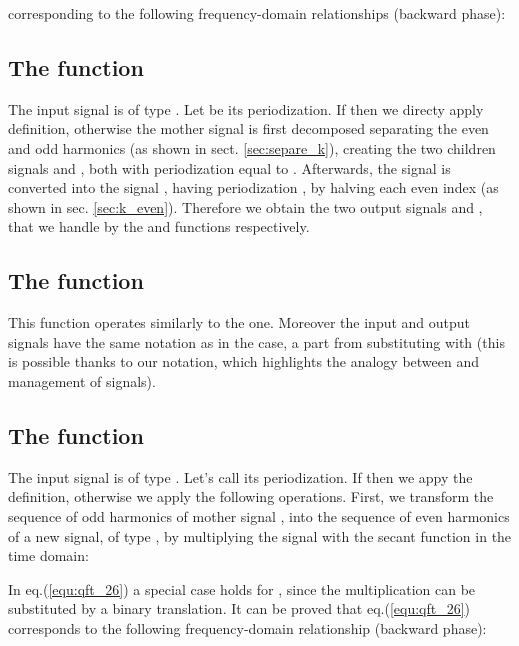 \documentclass[a4paper,10pt]{article}
\begin{document}
corresponding to the following frequency-domain relationships (backward phase):
















\subsection{The  function} \label{dct_function}

The input signal is of type . 
Let  be its periodization.
If  then we directy apply  definition, otherwise the mother signal  is first decomposed separating the even and odd harmonics (as shown in sect. \ref{sec:separe_k}), creating the two children signals  and , both with periodization equal to . 
Afterwards, the signal  is converted into the signal , having periodization , by halving each even  index (as shown in sec. \ref{sec:k_even}). 
Therefore we obtain the two output signals  and , that we handle by the  and  functions respectively.


\subsection{The  function}

This function operates similarly to the  one.
Moreover the input and output signals have the same notation as in the  case, a part from substituting  with  (this is possible thanks to our notation, 
which highlights the analogy between  and  management of signals).


\subsection{The  function}

The input signal is of type . Let's call  its periodization.
If  then we appy the  definition, otherwise we apply the following operations.
First, we transform the sequence of odd harmonics of mother signal , into the sequence of even harmonics of a new signal, of type , by multiplying the signal  with the secant function in the time domain:

In eq.(\ref{equ:qft_26}) a special case holds for , since the multiplication can be substituted by a binary translation.
It can be proved that eq.(\ref{equ:qft_26}) corresponds to the following frequency-domain relationship (backward phase):
\end{document}
